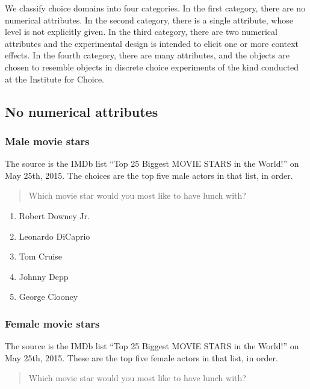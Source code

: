 \documentclass[11pt,letter]{amsart}
\begin{document}
\label{s:domains}

We classify choice domains into four categories. In the first category,
there are no numerical attributes. In the second category, there is a single
attribute, whose level is not explicitly given. In the third category, there
are two numerical attributes and the experimental design is intended to
elicit one or more context effects. In the fourth category, there are many
attributes, and the objects are chosen to resemble objects in discrete
choice experiments of the kind conducted at the Institute for Choice.

\subsection{No numerical attributes}

\subsubsection{Male movie stars}

The source is the IMDb list ``Top 25 Biggest MOVIE STARS in the World!'' on
May 25th, 2015. The choices are the top five male actors in that list, in
order.

\begin{quotation}
Which movie star would you most like to have lunch with?
\end{quotation}

\begin{enumerate}
\item Robert Downey Jr. 

\item Leonardo DiCaprio 

\item Tom Cruise 

\item Johnny Depp 

\item George Clooney
\end{enumerate}

\subsubsection{Female movie stars}

The source is the IMDb list ``Top 25 Biggest MOVIE STARS in the World!'' on
May 25th, 2015. These are the top five female actors in that list, in order.

\begin{quotation}
Which movie star would you most like to have lunch with?
\end{quotation}
\end{document}
